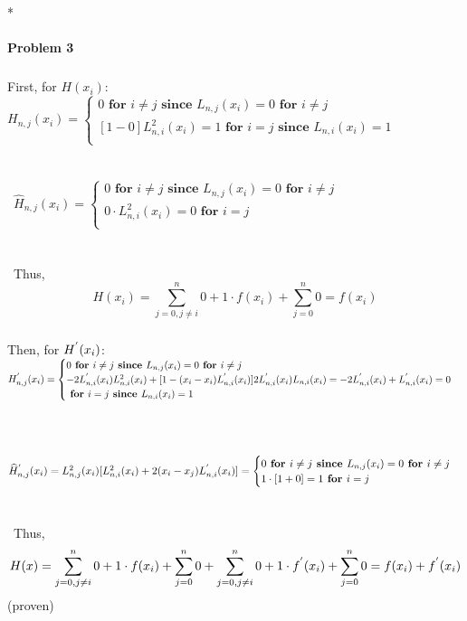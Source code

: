 *\documentclass{article}
\begin{document}
\paragraph{Problem 3}
\subparagraph{}
First, for $H(x_i)$: \\
$H_{n,j}(x_i)= 
\begin{cases}
               0 \textbf{ for } i\neq j\textbf{ since } L_{n,j}(x_i) = 0 \textbf{ for } i\neq j\\
               [1-0]L_{n,i}^2(x_i)= 1 \textbf{ for } i= j\textbf{ since } L_{n,i}(x_i) = 1\\
\end{cases}$\\~\\~\\\
$\widehat{H}_{n,j}(x_i)= 
\begin{cases}
               0 \textbf{ for } i\neq j\textbf{ since } L_{n,j}(x_i) = 0 \textbf{ for } i\neq j\\
               0\cdot L_{n,i}^2(x_i)= 0 \textbf{ for } i= j \\
\end{cases}$\\~\\~\\\
Thus, $$H(x_i) = \sum_{j=0, j\neq i}^{n}0 + 1\cdot f(x_i) + \sum_{j=0}^{n} 0 = f(x_i)$$
\subparagraph{}
Then, for $H^{\rq}(x_i)$: \\
$H_{n,j}^{\rq}(x_i)= 
\begin{cases}
               0 \textbf{ for } i\neq j\textbf{ since } L_{n,j}(x_i) = 0 \textbf{ for } i\neq j\\
               -2L_{n,i}^{\rq}(x_i)L_{n,i}^{2}(x_i)+[1-(x_i-x_i)L_{n,i}^{\rq}(x_i)]2L_{n,i}^{\rq}(x_i)L_{n,i}(x_i)= -2L_{n,i}^{\rq}(x_i)  + L_{n,i}^{\rq}(x_i)=0  \\
               \textbf{ for } i= j\textbf{ since } L_{n,i}(x_i) = 1\\
\end{cases}$\\~\\~\\\
$\widehat{H}_{n,j}^{\rq}(x_i)= L_{n,j}^{2}(x_i)[L_{n,i}^{2}(x_i)+2(x_i-x_j)L_{n,i}^{\rq}(x_i)] =
\begin{cases}
               0 \textbf{ for } i\neq j\textbf{ since } L_{n,j}(x_i) = 0 \textbf{ for } i\neq j\\
               1\cdot [1+0]= 1 \textbf{ for } i= j \\
\end{cases}$\\~\\~\\\
Thus, $$H(x) = \sum_{j=0, j\neq i}^{n}0 + 1\cdot f(x_i) + \sum_{j=0}^{n} 0 + \sum_{j=0, j\neq i}^{n}0 + 1\cdot f^{\rq}(x_i) + \sum_{j=0}^{n} 0= f(x_i) +f^{\rq}(x_i)$$ (proven)
\end{document}
